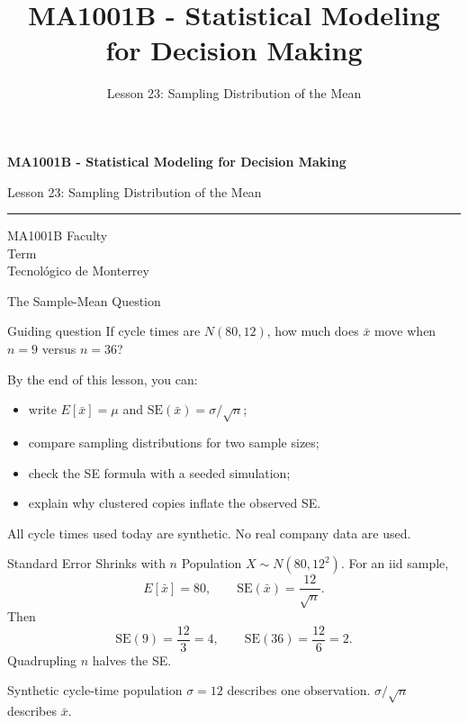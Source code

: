 \documentclass[aspectratio=169,10pt,english]{beamer}
\title{MA1001B - Statistical Modeling for Decision Making}
\subtitle{Lesson 23: Sampling Distribution of the Mean}
\author{}
\institute{Tecnol\'ogico de Monterrey}
\date{}
\begin{document}
\begin{frame}[plain]
  \vspace{1.2cm}
  {\Large\bfseries MA1001B - Statistical Modeling for Decision Making\par}
  \vspace{0.7cm}
  {\large Lesson 23: Sampling Distribution of the Mean\par}
  \vspace{0.7cm}
  {\color{TecRojo}\rule{\textwidth}{1.2pt}}
  \vspace{0.8cm}

  MA1001B Faculty\\[0.3cm]
  Term\\[0.3cm]
  Tecnol\'ogico de Monterrey
\end{frame}

\begin{frame}{The Sample-Mean Question}
  \begin{alertblock}{Guiding question}
    If cycle times are $N(80,12)$, how much does $\bar x$ move when
    $n=9$ versus $n=36$?
  \end{alertblock}

  \vspace{0.6em}
  By the end of this lesson, you can:
  \begin{itemize}
    \item write $E[\bar x]=\mu$ and $\mathrm{SE}(\bar x)=\sigma/\sqrt{n}$;
    \item compare sampling distributions for two sample sizes;
    \item check the SE formula with a seeded simulation;
    \item explain why clustered copies inflate the observed SE.
  \end{itemize}

  \vfill
  \scriptsize All cycle times used today are synthetic. No real company data are used.
\end{frame}

\begin{frame}{Standard Error Shrinks with $n$}
  \small
  Population $X\sim N(80,12^2)$. For an iid sample,
  \[
    E[\bar x]=80,\qquad
    \mathrm{SE}(\bar x)=\frac{12}{\sqrt{n}}.
  \]
  Then
  \[
    \mathrm{SE}(9)=\frac{12}{3}=4,\qquad
    \mathrm{SE}(36)=\frac{12}{6}=2.
  \]
  Quadrupling $n$ halves the SE.

  \vspace{0.3em}
  \begin{exampleblock}{Synthetic cycle-time population}
    $\sigma=12$ describes one observation. $\sigma/\sqrt{n}$ describes $\bar x$.
  \end{exampleblock}
\end{frame}
\end{document}
